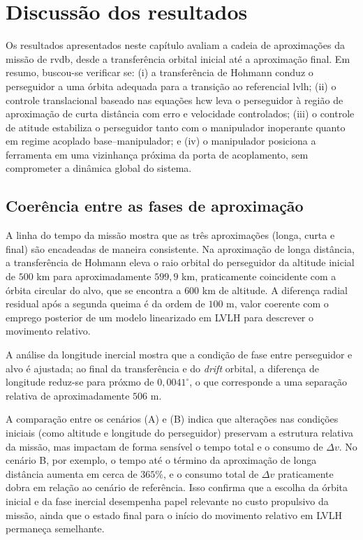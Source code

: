 \section{Discussão dos resultados}
\label{sec:cap4_app_final_discussao}

Os resultados apresentados neste capítulo avaliam a cadeia de aproximações da missão de \gls{rvdb}, desde a transferência orbital inicial até a aproximação final.
Em resumo, buscou-se verificar se:
(i) a transferência de Hohmann conduz o perseguidor a uma órbita adequada para a transição ao referencial \gls{lvlh};
(ii) o controle translacional baseado nas equações \gls{hcw} leva o perseguidor à região de aproximação de curta distância com erro e velocidade controlados;
(iii) o controle de atitude estabiliza o perseguidor tanto com o manipulador inoperante quanto em regime acoplado base--manipulador;
e (iv) o manipulador posiciona a ferramenta em uma vizinhança próxima da porta de acoplamento, sem comprometer a dinâmica global do sistema.

\subsection{Coerência entre as fases de aproximação}

A linha do tempo da missão mostra que as três aproximações (longa, curta e final) são encadeadas de maneira consistente.
Na aproximação de longa distância, a transferência de Hohmann eleva o raio orbital do perseguidor da altitude inicial de $500$ km para aproximadamente $599{,}9$ km, praticamente coincidente com a órbita circular do alvo, que se encontra a $600$ km de altitude. A diferença radial residual após a segunda queima é da ordem de $100$ m, valor coerente com o emprego posterior de um modelo linearizado em LVLH para descrever o movimento relativo.

A análise da longitude inercial mostra que a condição de fase entre perseguidor e alvo é ajustada;
ao final da transferência e do \emph{drift} orbital, a diferença de longitude reduz-se para próxmo de $0{,}0041^\circ$, o que corresponde a uma separação relativa de aproximadamente $506$ m. 

A comparação entre os cenários (A) e (B) indica que alterações nas condições iniciais (como altitude e longitude do perseguidor) preservam a estrutura relativa da missão, mas impactam de forma sensível o tempo total e o consumo de $\Delta v$.
No cenário B, por exemplo, o tempo até o término da aproximação de longa distância aumenta em cerca de $365\%$, e o consumo total de $\Delta v$ praticamente dobra em relação ao cenário de referência. Isso confirma que a escolha da órbita inicial e da fase inercial desempenha papel relevante no custo propulsivo da missão, ainda que o estado final para o início do movimento relativo em LVLH permaneça semelhante.

